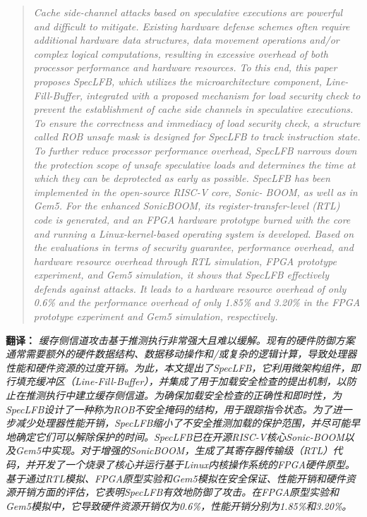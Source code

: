 \documentclass[10pt]{article}
\begin{document}
  \begin{quotation}
    \textit{Cache side-channel attacks based on speculative executions
    are powerful and difficult to mitigate. Existing hardware defense
    schemes often require additional hardware data structures,
    data movement operations and/or complex logical computations,
    resulting in excessive overhead of both processor
    performance and hardware resources. To this end, this paper
    proposes SpecLFB, which utilizes the microarchitecture component,
    Line-Fill-Buffer, integrated with a proposed mechanism
    for load security check to prevent the establishment of
    cache side channels in speculative executions. To ensure the
    correctness and immediacy of load security check, a structure
    called ROB unsafe mask is designed for SpecLFB to track
    instruction state. To further reduce processor performance
    overhead, SpecLFB narrows down the protection scope of
    unsafe speculative loads and determines the time at which
    they can be deprotected as early as possible. SpecLFB has
    been implemented in the open-source RISC-V core, Sonic-
    BOOM, as well as in Gem5. For the enhanced SonicBOOM,
    its register-transfer-level (RTL) code is generated, and an
    FPGA hardware prototype burned with the core and running a
    Linux-kernel-based operating system is developed. Based on
    the evaluations in terms of security guarantee, performance
    overhead, and hardware resource overhead through RTL simulation,
    FPGA prototype experiment, and Gem5 simulation,
    it shows that SpecLFB effectively defends against attacks. It
    leads to a hardware resource overhead of only 0.6\% and the
    performance overhead of only 1.85\% and 3.20\% in the FPGA
    prototype experiment and Gem5 simulation, respectively.}
  \end{quotation}

  \begin{remark}\textbf{翻译：}
    \textit{缓存侧信道攻击基于推测执行非常强大且难以缓解。现有的硬件防御方案通常需要额外的硬件数据结构、数据移动操作和/或复杂的逻辑计算，导致处理器性能和硬件资源的过度开销。为此，本文提出了SpecLFB，它利用微架构组件，即行填充缓冲区（Line-Fill-Buffer），并集成了用于加载安全检查的提出机制，以防止在推测执行中建立缓存侧信道。为确保加载安全检查的正确性和即时性，为SpecLFB设计了一种称为ROB不安全掩码的结构，用于跟踪指令状态。为了进一步减少处理器性能开销，SpecLFB缩小了不安全推测加载的保护范围，并尽可能早地确定它们可以解除保护的时间。SpecLFB已在开源RISC-V核心Sonic-BOOM以及Gem5中实现。对于增强的SonicBOOM，生成了其寄存器传输级（RTL）代码，并开发了一个烧录了核心并运行基于Linux内核操作系统的FPGA硬件原型。基于通过RTL模拟、FPGA原型实验和Gem5模拟在安全保证、性能开销和硬件资源开销方面的评估，它表明SpecLFB有效地防御了攻击。在FPGA原型实验和Gem5模拟中，它导致硬件资源开销仅为0.6\%，性能开销分别为1.85\%和3.20\%。} 
    \end{remark}
    
\end{document}
